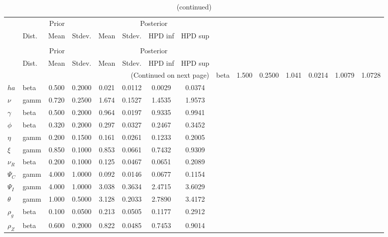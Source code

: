  
\begin{center}
\begin{longtable}{llcccccc} 
\caption{Results from Metropolis-Hastings (parameters)}
 \label{Table:MHPosterior:1}\\
\toprule 
  & \multicolumn{3}{c}{Prior}  &  \multicolumn{4}{c}{Posterior} \\
  \cmidrule(r{.75em}){2-4} \cmidrule(r{.75em}){5-8}
  & Dist. & Mean  & Stdev. & Mean & Stdev. & HPD inf & HPD sup\\
\midrule \endfirsthead 
\caption{(continued)}\\\toprule 
  & \multicolumn{3}{c}{Prior}  &  \multicolumn{4}{c}{Posterior} \\
  \cmidrule(r{.75em}){2-4} \cmidrule(r{.75em}){5-8}
  & Dist. & Mean  & Stdev. & Mean & Stdev. & HPD inf & HPD sup\\
\midrule \endhead 
\bottomrule \multicolumn{8}{r}{(Continued on next page)} \endfoot 
\bottomrule \endlastfoot 
${\sigma}$ & beta &   1.500 & 0.2500 &   1.041& 0.0214 &  1.0079 &  1.0728 \\ 
${ha}$ & beta &   0.500 & 0.2000 &   0.021& 0.0112 &  0.0029 &  0.0374 \\ 
$\nu$ & gamm &   0.720 & 0.2500 &   1.674& 0.1527 &  1.4535 &  1.9573 \\ 
$\gamma$ & beta &   0.500 & 0.2000 &   0.964& 0.0197 &  0.9335 &  0.9941 \\ 
${\phi}$ & beta &   0.320 & 0.2000 &   0.297& 0.0327 &  0.2467 &  0.3452 \\ 
${\eta}$ & gamm &   0.200 & 0.1500 &   0.161& 0.0261 &  0.1233 &  0.2005 \\ 
$\xi$ & gamm &   0.850 & 0.1000 &   0.853& 0.0661 &  0.7432 &  0.9309 \\ 
${\nu_R}$ & beta &   0.200 & 0.1000 &   0.125& 0.0467 &  0.0651 &  0.2089 \\ 
${\Psi_{C}}$ & gamm &   4.000 & 1.0000 &   0.092& 0.0146 &  0.0677 &  0.1154 \\ 
${\Psi_I}$ & gamm &   4.000 & 1.0000 &   3.038& 0.3634 &  2.4715 &  3.6029 \\ 
${\theta}$ & gamm &   1.000 & 0.5000 &   3.128& 0.2033 &  2.7890 &  3.4172 \\ 
${\rho_g}$ & beta &   0.100 & 0.0500 &   0.213& 0.0505 &  0.1177 &  0.2912 \\ 
${\rho_Z}$ & beta &   0.600 & 0.2000 &   0.822& 0.0485 &  0.7453 &  0.9014 \\ 

\end{longtable}
\end{center}
